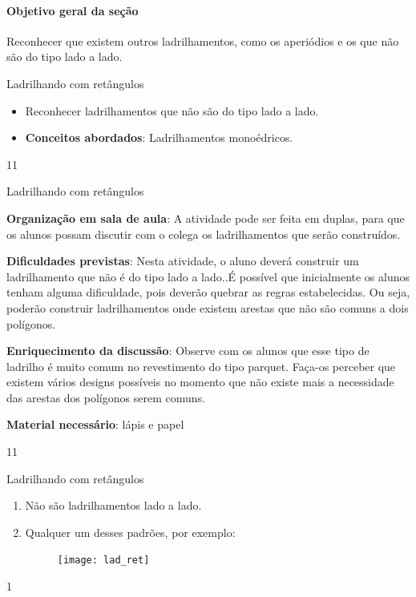 \cleardoublepage
\def\currentcolor{session1}
\begin{texto}
{
\paragraph {Objetivo geral da seção}
Reconhecer que existem outros ladrilhamentos, como os aperiódios e os que não são do tipo lado a lado.}
\end{texto}
\marginpar{\vspace{-\baselineskip}}
\begin{objectives}{Ladrilhando com retângulos}
{
	\begin{itemize}
	\item Reconhecer ladrilhamentos que não são do tipo lado a lado.
	\item \textbf{Conceitos abordados}: Ladrilhamentos monoédricos.
	\end{itemize}	
}{1}{1}
\end{objectives}
\marginpar{\vspace{-2\baselineskip}}
\begin{sugestions}{Ladrilhando com retângulos}
{
	\textbf{Organização em sala de aula}: A atividade pode ser feita em duplas, para que os alunos possam discutir com o colega os ladrilhamentos que serão construídos.

	\textbf{Dificuldades previstas}: Nesta atividade, o aluno deverá construir um ladrilhamento que não é do tipo lado a lado..É possível que inicialmente os alunos tenham alguma dificuldade, pois deverão quebrar as regras estabelecidas. Ou seja, poderão construir ladrilhamentos onde existem arestas que não são comuns a dois polígonos.

	\textbf{Enriquecimento da discussão}: Observe com os alunos que esse tipo de ladrilho é muito comum no revestimento do tipo parquet. Faça-os perceber que existem vários designs possíveis no momento que não existe mais a necessidade das arestas dos polígonos serem comuns. 

	\textbf{Material necessário}: lápis e papel

}{1}{1}
\end{sugestions}
\marginpar{\vspace{-\baselineskip}}
\begin{answer}{Ladrilhando com retângulos}
{
	\begin{enumerate}
	\item Não são ladrilhamentos lado a lado.
	\item Qualquer um desses padrões, por exemplo:
	\begin{figure}[H]
	\centering
	\texttt{[image: lad\_ret]}
	\end{figure}
	\end{enumerate}
}{1}
\end{answer}
